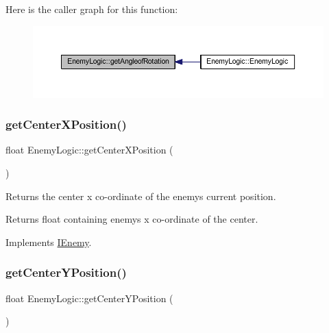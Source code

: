 Here is the caller graph for this function\+:\nopagebreak
\begin{figure}[H]
\begin{center}
\leavevmode
\includegraphics[width=350pt]{class_enemy_logic_ade03be41505c71de49f20fc855c8fede_icgraph}
\end{center}
\end{figure}
\mbox{\label{class_enemy_logic_a1429e91a81da7646d9b0280f26519d8c}} 
\subsubsection{\texorpdfstring{get\+Center\+X\+Position()}{getCenterXPosition()}}
{\footnotesize\ttfamily float Enemy\+Logic\+::get\+Center\+X\+Position (\begin{DoxyParamCaption}{ }\end{DoxyParamCaption})\hspace{0.3cm}{\ttfamily [virtual]}}



Returns the center x co-\/ordinate of the enemy\textquotesingle{}s current position. 

\begin{DoxyReturn}{Returns}
float containing enemy\textquotesingle{}s x co-\/ordinate of the center. 
\end{DoxyReturn}


Implements \hyperlink{class_i_enemy_ab5bc39484a8aeaf278c3d127ec5d9545}{I\+Enemy}.

\mbox{\label{class_enemy_logic_a8eb47a87a47288783e0c8963c39d24e4}} 
\subsubsection{\texorpdfstring{get\+Center\+Y\+Position()}{getCenterYPosition()}}
{\footnotesize\ttfamily float Enemy\+Logic\+::get\+Center\+Y\+Position (\begin{DoxyParamCaption}{ }\end{DoxyParamCaption})\hspace{0.3cm}{\ttfamily [virtual]}}



